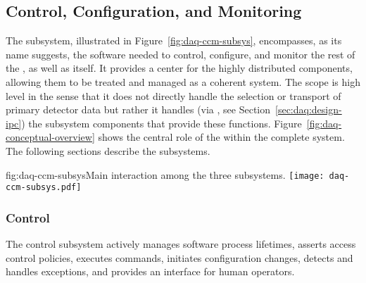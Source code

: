 
\subsection{Control, Configuration, and Monitoring}
\label{sec:fd-daq:design-run-control}


The  subsystem, illustrated in Figure~\ref{fig:daq-ccm-subsys}, encompasses, as its name suggests, the software needed to control, configure, and monitor the rest of the , as well as itself. 
It provides a center for the highly distributed  components, allowing them to be treated and managed as a coherent system. 
The  scope is high level in the sense that it does not directly handle the selection or transport of primary detector data but rather it handles (via , see Section~\ref{sec:daq:design-ipc}) the subsystem components that provide these functions.
Figure~\ref{fig:daq-conceptual-overview} shows the central role of the  within the complete  system.
The following sections describe the  subsystems. 

\begin{dunefigure}{fig:daq-ccm-subsys}{Main interaction among the three  subsystems.}
  \texttt{[image: daq-ccm-subsys.pdf]}
\end{dunefigure}

\subsubsection{Control}
\label{sec:daq:design:ccm:control}


The  control subsystem actively manages  software process lifetimes, asserts access control policies, executes commands, initiates configuration changes, detects and handles exceptions, and provides an interface for human operators.

